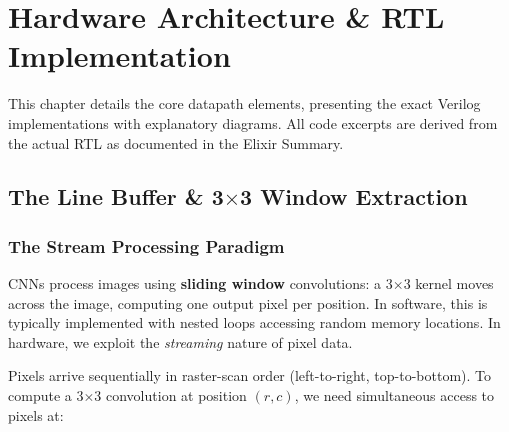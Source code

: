 \documentclass[11pt,a4paper]{report}
\begin{document}

\chapter{Hardware Architecture \& RTL Implementation}

This chapter details the core datapath elements, presenting the exact Verilog implementations with explanatory diagrams. All code excerpts are derived from the actual RTL as documented in the Elixir Summary.

\section{The Line Buffer \& 3$\times$3 Window Extraction}

\subsection{The Stream Processing Paradigm}

CNNs process images using \textbf{sliding window} convolutions: a 3$\times$3 kernel moves across the image, computing one output pixel per position. In software, this is typically implemented with nested loops accessing random memory locations. In hardware, we exploit the \textit{streaming} nature of pixel data.

Pixels arrive sequentially in raster-scan order (left-to-right, top-to-bottom). To compute a 3$\times$3 convolution at position $(r, c)$, we need simultaneous access to pixels at:

\begin{center}
\end{center}
\end{document}
